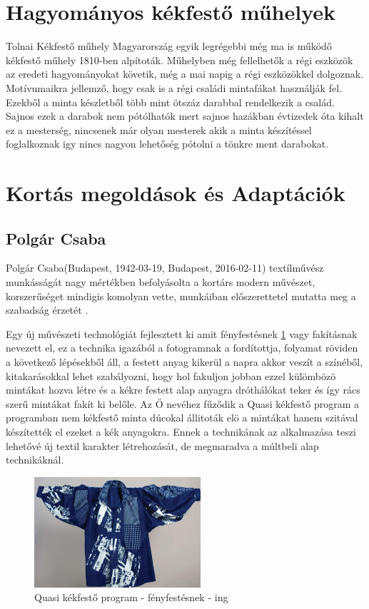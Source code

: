 \documentclass[fontsize=12pt, appendixprefix=true]{scrreprt}
\begin{document}
\section{Hagyományos kékfestő műhelyek}
Tolnai Kékfestő műhely Magyarország  egyik legrégebbi még ma is működő kékfestő műhely 1810-ben alpítoták.
Műhelyben még fellelhetők a régi eszközök az eredeti hagyományokat követik, még a mai napig a régi eszközökkel dolgoznak.
Motívumaikra jellemző, hogy csak is a régi családi mintafákat használják fel.
Ezekből a minta készletből több mint ötszáz darabbal rendelkezik a család.
Sajnos ezek a darabok nem pótólhatók mert sajnos hazákban évtizedek óta kihalt ez a mesterség, nincsenek már olyan mesterek akik a minta készítéssel foglalkoznak igy nincs nagyon lehetőség pótolni a tönkre 
ment darabokat.

\section{Kortás megoldások és Adaptációk}

\subsection{Polgár Csaba}
Polgár Csaba(Budapest, 1942-03-19, Budapest, 2016-02-11) textílművész munkásságát nagy mértékben befolyásolta a kortárs modern művészet, korszerűséget mindigis komolyan vette, munkáiban előszerettetel mutatta meg a szabadság érzetét \cite{plogarcs}.

Egy új művészeti technológiát fejlesztett ki amit fényfestésnek \ref{fig:quasi} vagy fakításnak nevezett el, ez a technika igazából a fotogramnak a fordítottja, folyamat röviden  a következő lépésekből áll, a festett anyag kikerül a napra akkor veszít a színéből, kitakarásokkal lehet szabályozni, hogy hol fakuljon jobban ezzel külömbözö mintákat hozva létre és a kékre festett alap anyagra dróthálókat teker és így rács szerű mintákat fakít ki belőle.
Az Ő nevéhez fűződik a Quasi kékfestő program  a programban nem  kékfestő minta dúcokal állitoták elö a mintákat hanem szitával készítették el ezeket a kék anyagokra. Ennek a technikának az alkalmazása teszi lehetővé új textil karakter  létrehozását, de megmaradva a múltbeli alap technikáknál.

\begin{figure}[h!]
	\centering
	\includegraphics[width=0.55\textwidth]{img/quasi.jpg}
	\caption{Quasi kékfestő program - fényfestésnek - ing}
	\label{fig:quasi}
\end{figure}
\end{document}
